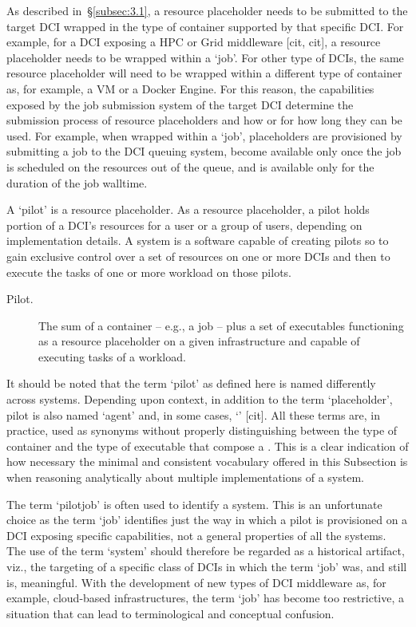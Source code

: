 \documentclass{sig-alternate}
\begin{document}
As described in~\S\ref{subsec:3.1}, a resource placeholder needs to be
submitted to the target DCI wrapped in the type of container supported
by that specific DCI. For example, for a DCI exposing a HPC or Grid
middleware [cit, cit], a resource placeholder needs to be wrapped within
a `job'. For other type of DCIs, the same resource placeholder will need
to be wrapped within a different type of container as, for example, a VM
or a Docker Engine. For this reason, the capabilities exposed by the job
submission system of the target DCI determine the submission process of
resource placeholders and how or for how long they can be used. For
example, when wrapped within a `job', placeholders are provisioned by
submitting a job to the DCI queuing system, become available only once
the job is scheduled on the resources out of the queue, and is
available only for the duration of the job walltime.

A `pilot' is a resource placeholder. As a resource placeholder, a pilot
holds portion of a DCI's resources for a user or a group of users,
depending on implementation details. A \pilot system is a software
capable of creating pilots so to gain exclusive control over a set of
resources on one or more DCIs and then to execute the tasks of
one or more workload on those pilots.

\begin{description}

\item[Pilot.] The sum of a container -- e.g., a job -- plus a set of
executables functioning as a resource placeholder on a given
infrastructure and capable of executing tasks of a workload.

\end{description}

It should be noted that the term `pilot' as defined here is named
differently across \pilot systems. Depending upon context, in addition
to the term `placeholder', pilot is also named `agent' and, in some
cases, `\pilotjob' [cit]. All these terms are, in practice, used as
synonyms without properly distinguishing between the type of container
and the type of executable that compose a \pilot. This is a clear
indication of how necessary the minimal and consistent vocabulary
offered in this Subsection is when reasoning analytically about multiple
implementations of a \pilotjob system.

The term `pilotjob' is often used to identify a \pilot system. This is
an unfortunate choice as the term `job' identifies just the way in which
a pilot is provisioned on a DCI exposing specific capabilities, not a
general properties of all the \pilot systems. The use of the term
`\pilotjob system' should therefore be regarded as a historical
artifact, viz., the targeting of a specific class of DCIs in which
the term `job' was, and still is, meaningful. With the development of
new types of DCI middleware as, for example, cloud-based infrastructures,
the term `job' has become too restrictive, a situation that can lead to
terminological and conceptual confusion.
\end{document}
